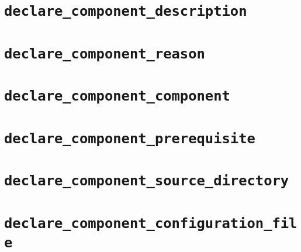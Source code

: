 \section{\texttt{declare\_component\_description}}\label{api:declare-component-description}
\section{\texttt{declare\_component\_reason}}\label{api:declare-component-reaso}
\section{\texttt{declare\_component\_component}}\label{api:declare-component-component}
\section{\texttt{declare\_component\_prerequisite}}\label{api:declare-component-prerequisite}
\section{\texttt{declare\_component\_source\_directory}}\label{api:declare-component-source-directory}
\section{\texttt{declare\_component\_configuration\_file}}\label{api:declare-component-configuration-file}

